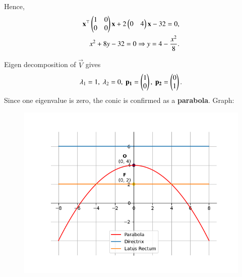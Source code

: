 \documentclass[journal,12pt,onecolumn]{IEEEtran}
\begin{document}
Hence,
\begin{align}
\mathbf{x}^\top\begin{pmatrix}1 & 0 \\ 0 & 0\end{pmatrix}\mathbf{x} + 2\begin{pmatrix}0 & 4\end{pmatrix}\mathbf{x} - 32 = 0,\\
x^2 + 8y - 32 = 0 \Rightarrow y =4- \frac{x^2}{8}.
\end{align}

Eigen decomposition of $\vec{V}$ gives
\begin{align}
\lambda_1 = 1, \ \lambda_2 = 0, \ 
\vec{p_1} = \myvec{1 \\ 0}, \ 
\vec{p_2} = \myvec{0 \\ 1}.
\end{align}
Since one eigenvalue is zero, the conic is confirmed as a \textbf{parabola}.
\newline
Graph:
\begin{figure}[H]
    \centering
    \includegraphics[scale=0.5]{plot}
    \caption{}
    \label{fig:plot}
\end{figure}
\end{document}
